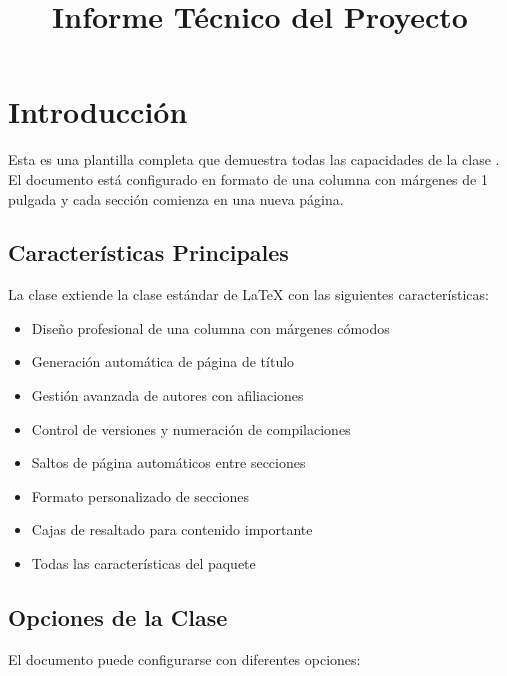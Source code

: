 \documentclass{pt-report}
\title{Informe Técnico del Proyecto}
\begin{document}
\maketitle

\tableofcontents
\ptlistoffigures  %
\ptlistoftables   %
\ptlistofcodes    %

\section{Introducción}

Esta es una plantilla completa que demuestra todas las capacidades de la clase
. El documento está configurado en formato de una columna
con márgenes de 1 pulgada y cada sección comienza en una nueva página.

\subsection{Características Principales}

La clase  extiende la clase estándar 
de \LaTeX{} con las siguientes características:

\begin{itemize}
    \item Diseño profesional de una columna con márgenes cómodos
    \item Generación automática de página de título
    \item Gestión avanzada de autores con afiliaciones
    \item Control de versiones y numeración de compilaciones
    \item Saltos de página automáticos entre secciones
    \item Formato personalizado de secciones
    \item Cajas de resaltado para contenido importante
    \item Todas las características del paquete 
\end{itemize}

\subsection{Opciones de la Clase}

El documento puede configurarse con diferentes opciones:
\end{document}
